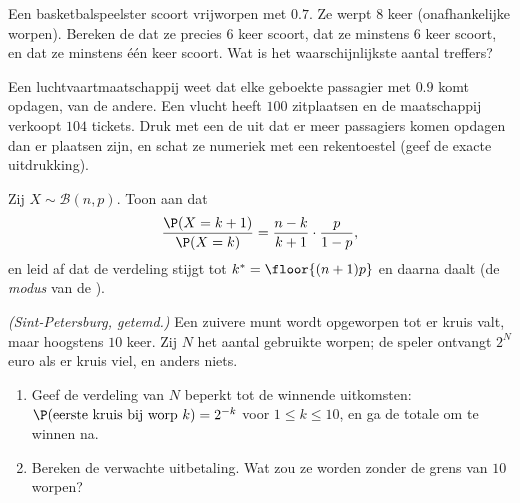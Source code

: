 \begin{exercise}[$\star\star$]\label{exo:g12:randvar:5}
Een basketbalspeelster scoort vrijworpen met  $0.7$. Ze werpt $8$ keer
(onafhankelijke worpen). Bereken de  dat ze precies $6$ keer scoort, dat
ze minstens $6$ keer scoort, en dat ze minstens één keer scoort. Wat is het
waarschijnlijkste aantal treffers?
\end{exercise}

\begin{exercise}[$\star\star$]\label{exo:g12:randvar:6}
Een luchtvaartmaatschappij weet dat elke geboekte passagier met  $0.9$
komt opdagen,  van de andere. Een vlucht heeft $100$
zitplaatsen en de maatschappij verkoopt $104$ tickets. Druk met een  de  uit dat er meer passagiers komen opdagen dan er plaatsen
zijn, en schat ze numeriek met een rekentoestel (geef de exacte uitdrukking).
\end{exercise}

\begin{exercise}[$\star\star$]\label{exo:g12:randvar:7}
Zij $X \sim \mathcal B(n, p)$. Toon aan dat
\[
\frac{\P(X = k+1)}{\P(X = k)} = \frac{n-k}{k+1}\cdot\frac{p}{1-p},
\]
en leid af dat de verdeling stijgt tot $k^* = \floor{(n+1)p}$ en daarna daalt
(de \emph{modus} van de ).
\end{exercise}

\begin{exercise}[$\star\star\star$]\label{exo:g12:randvar:8}
\emph{(Sint-Petersburg, getemd.)} Een zuivere munt wordt opgeworpen tot er
kruis valt, maar hoogstens $10$ keer. Zij $N$ het aantal gebruikte worpen; de
speler ontvangt $2^N$ euro als er kruis viel, en anders niets.
\begin{enumerate}
  \item Geef de verdeling van $N$ beperkt tot de winnende uitkomsten:
        $\P(\text{eerste kruis bij worp } k) = 2^{-k}$ voor
        $1 \leq k \leq 10$, en ga de totale  om te winnen na.
  \item Bereken de verwachte uitbetaling. Wat zou ze worden zonder de grens
        van $10$ worpen?
\end{enumerate}
\end{exercise}

